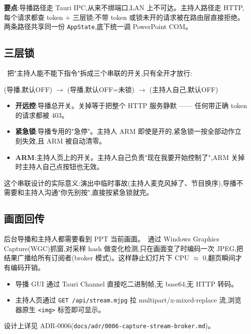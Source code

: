 \textbf{要点}:导播路径走 Tauri IPC,从来不绑端口,LAN 上不可达。主持人路径走 HTTP,每个请求都查 token + 三层锁;不带 token 或锁未开的请求被在路由层直接拒绝。两条路径共享同一份 \texttt{AppState},底下统一调 PowerPoint COM。

\subsection{三层锁}

\app\ 把"主持人能不能下指令"拆成三个串联的开关,只有全开才放行:

\begin{center}\small\sffamily
{}(导播,默认\textcolor{sdred}{OFF}) $\to$
(导播,默认\textcolor{sdok}{OFF=未锁}) $\to$
(主持人自己,默认\textcolor{sdred}{OFF})
\end{center}

\begin{itemize}
  \item \textbf{开远控}:导播总开关。关掉等于把整个 HTTP 服务静默 —— 任何带正确 token 的请求都被 403。
  \item \textbf{紧急锁}:导播专用的"急停"。主持人 ARM 即使是开的,紧急锁一按全部动作立刻失效,且 ARM 被自动清零。
  \item \textbf{ARM}:主持人页上的开关。主持人自己负责"现在我要开始控制了",ARM 关掉时主持人自己点按钮也无效。
\end{itemize}

这个串联设计的实际意义:演出中临时事故(主持人麦克风掉了、节目换序),导播不需要和主持人沟通"你先别按",直接按紧急锁就完。

\subsection{画面回传}

后台导播和主持人都需要看到 PPT 当前画面。\app\ 通过 Windows Graphics Capture(WGC)抓窗,对采样 hash 做变化检测,只在画面变了时编码一次 JPEG,把结果广播给所有订阅者(broker 模式)。这样静止幻灯片下 CPU $\approx$ 0,翻页瞬间才有编码开销。

\begin{itemize}
  \item 导播 GUI 通过 Tauri Channel 直接吃二进制帧,无 base64,无 HTTP 转码。
  \item 主持人页通过 \texttt{GET /api/stream.mjpg} 拉 multipart/x-mixed-replace 流,浏览器原生 \texttt{<img>} 标签即可显示。
\end{itemize}

设计上详见 ADR-0006(\texttt{docs/adr/0006-capture-stream-broker.md})。
